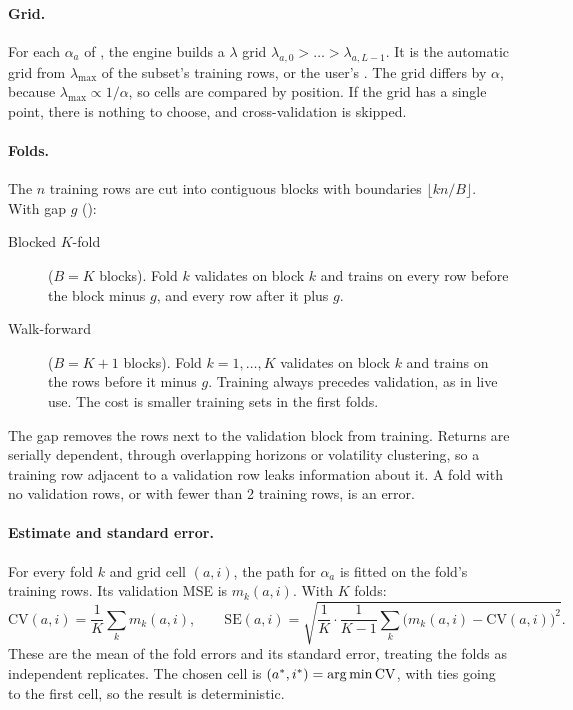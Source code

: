 \paragraph{Grid.} For each $\alpha_a$ of , the engine builds a $\lambda$ grid
$\lambda_{a,0}>\dots>\lambda_{a,L-1}$. It is the automatic grid from $\lambda_{\max}$ of the
subset's training rows, or the user's . The grid differs by $\alpha$, because
$\lambda_{\max}\propto1/\alpha$, so cells are compared by position. If the grid has a single
point, there is nothing to choose, and cross-validation is skipped.

\paragraph{Folds.} The $n$ training rows are cut into contiguous blocks with boundaries
$\lfloor kn/B\rfloor$. With gap $g$ ():
\begin{description}
  \item[Blocked $K$-fold] ($B=K$ blocks). Fold $k$ validates on block $k$ and trains on every
        row before the block minus $g$, and every row after it plus $g$.
  \item[Walk-forward] ($B=K+1$ blocks). Fold $k=1,\dots,K$ validates on block $k$ and trains on
        the rows before it minus $g$. Training always precedes validation, as in live use.
        The cost is smaller training sets in the first folds.
\end{description}
The gap removes the rows next to the validation block from training. Returns are serially
dependent, through overlapping horizons or volatility clustering, so a training row adjacent
to a validation row leaks information about it. A fold with no validation rows, or with fewer
than 2 training rows, is an error.

\paragraph{Estimate and standard error.} For every fold $k$ and grid cell $(a,i)$, the path for
$\alpha_a$ is fitted on the fold's training rows. Its validation MSE is $m_k(a,i)$. With $K$
folds:
\[
  \mathrm{CV}(a,i)=\frac1K\sum_km_k(a,i),\qquad
  \mathrm{SE}(a,i)=\sqrt{\frac{1}{K}\cdot\frac{1}{K-1}\sum_k\big(m_k(a,i)-\mathrm{CV}(a,i)\big)^2}.
\]
These are the mean of the fold errors and its standard error, treating the folds as
independent replicates. The chosen cell is $(a^\ast,i^\ast)=\operatorname*{arg\,min}\mathrm{CV}$, with ties going
to the first cell, so the result is deterministic.

